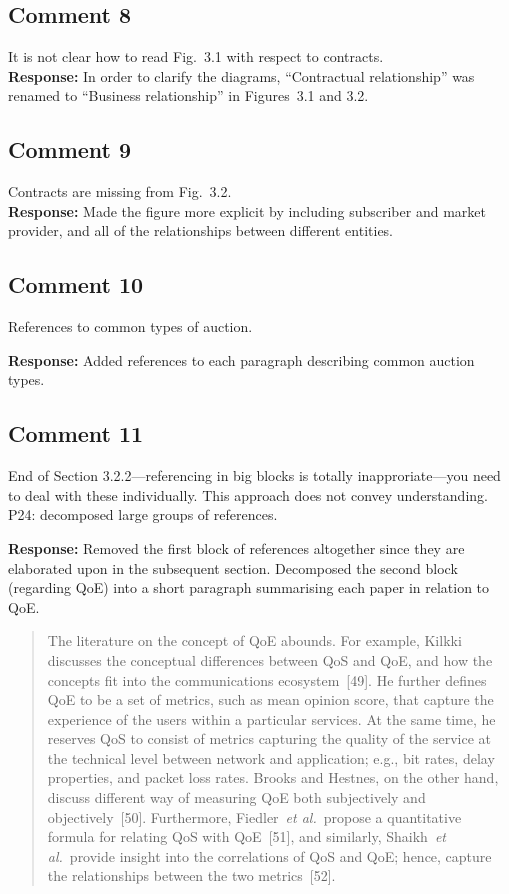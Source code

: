 \documentclass[10pt,a4paper,notitlepage]{article}
\numberwithin{equation}{section}
\begin{document}
\subsection{Comment 8}
It is not clear how to read Fig.~3.1 with respect to contracts.\\[-2ex]

\textbf{Response:}
In order to clarify the diagrams, ``Contractual relationship'' was renamed to ``Business relationship'' in Figures~3.1 and 3.2.

\subsection{Comment 9}
Contracts are missing from Fig.~3.2.\\[-2ex]

\textbf{Response:}
Made the figure more explicit by including subscriber and market provider, and all of the relationships between different entities.

\subsection{Comment 10}
References to common types of auction.

\textbf{Response:}
Added references to each paragraph describing common auction types.

\subsection{Comment 11}
End of Section 3.2.2---referencing in big blocks is totally inapproriate---you need to deal with these individually. This approach does not convey understanding. P24: decomposed large groups of references.

\textbf{Response:}
Removed the first block of references altogether since they are elaborated upon in the subsequent section. Decomposed the second block (regarding QoE) into a short paragraph summarising each paper in relation to QoE.
\begin{quote}
The literature on the concept of QoE abounds. For example, Kilkki discusses the conceptual differences between QoS and QoE, and how the concepts fit into the communications ecosystem~[49]. He further defines QoE to be a set of metrics, such as mean opinion score, that capture the experience of the users within a particular services. At the same time, he reserves QoS to consist of metrics capturing the quality of the service at the technical level between network and application; e.g., bit rates, delay properties, and packet loss rates. Brooks and Hestnes, on the other hand, discuss different way of measuring QoE both subjectively and objectively~[50]. Furthermore, Fiedler~\emph{et al.}~propose a quantitative formula for relating QoS with QoE~[51], and similarly, Shaikh~\emph{et al.}~provide insight into the correlations of QoS and QoE; hence, capture the relationships between the two metrics~[52].
\end{quote}
\end{document}
